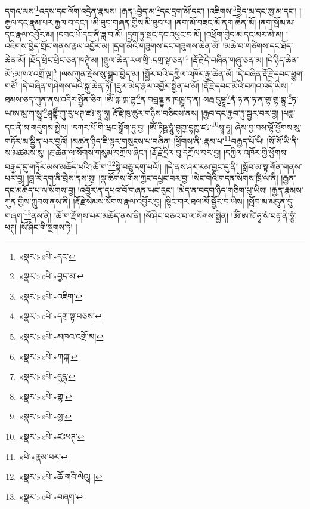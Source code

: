 དགའ་ལས་\footnote{«སྣར་»«པེ་»དང་}འདས་དང་ལོག་འདྲེན་རྣམས། །རྒན་:བྱེད་མ་\footnote{«སྣར་»«པེ་»བྱད་མ་}དང་དྲག་མོ་དང་། །འཇིགས་\footnote{«སྣར་»«པེ་»འཇིག་}བྱེད་མ་དང་ཨུ་མ་དང་། །རྒྱལ་དང་རྣམ་པར་རྒྱལ་བ་དང་། །མི་ཐུབ་གཞན་གྱིས་མི་ཐུབ་པ། །ནག་མོ་བཟང་མོ་ནག་ཆེན་མོ། །ནག་སྦོམ་མ་དང་རྣལ་འབྱོར་མ། །དབང་པོ་དང་ནི་ཟླ་བ་མོ། །དྲག་ཏུ་སྡང་དང་འཕྱང་བ་མོ། །འཕྲོག་བྱེད་མ་དང་མར་མེ་མ། །འཇིགས་བྱེད་གྲོང་གནས་རྣལ་འབྱོར་མ། །དྲག་མོའི་གཟུགས་དང་གཟུགས་ཆེན་མོ། །མཆེ་བ་གཙིགས་དང་ཐོད་ཆེན་མོ། །ཐོད་ཕྲེང་ཕྲེང་ཅན་ཁཊྭཱཾ་མ། །སྦྲུལ་ཆེན་རལ་གྲི་:དགྲ་སྟ་ཅན།\footnote{«སྣར་»«པེ་»དགྲ་སྟ་བཅས།} །རྡོ་རྗེ་དེ་བཞིན་གཞུ་ཅན་མ། །དེ་ཉིད་ཆེན་མོ་:མཁའ་འགྲོ་ལྔ།\footnote{«སྣར་»«པེ་»མཁའ་འགྲོ་མ།} །ལས་ཀུན་རྗེས་སུ་སྒྲུབ་བྱེད་མ། །སྦྱོར་བའི་དཀྱིལ་འཁོར་རྒྱ་ཆེན་མོ། །དེ་བཞིན་རྡོ་རྗེ་དབང་ཕྱུག་གཙོ། །དེ་བཞིན་གཤེགས་པའི་སྐུ་ཆེན་ཏེ། །རྡུལ་མེད་རྣལ་འབྱོར་སྦྱིན་པ་མོ། །རྡོ་རྗེ་དབང་མོའི་བཀའ་འདི་ཡིས། །ཐམས་ཅད་ཀུན་ནས་འདིར་སྤྱོན་ཅིག །ཨོཾ་ཀྐ་ཀྐ་ཌྷ་\footnote{«སྣར་»«པེ་»ཀཀྐ་}ན་བབྦནྡྷ་ན་ཁཁྑཱ་ད་ན། སརྦ་དུཥྚཱ་\footnote{«སྣར་»«པེ་»དུཥྚ་}ནཾ་ཧ་ན་ཧ་ན་གྷ་གྷ་གྷཱ་\footnote{«སྣར་»«པེ་»གྷ་}ཏ་ཡ་ཨ་མུ་ཀ་སྱཱ་\footnote{«སྣར་»«པེ་»སྱ་}ཤཱནྟིཾ་ཀུ་རུ་ཕཊ་ཛཿ་སྭཱ་ཧཱ། རྡོ་རྗེ་ཁུ་ཚུར་གཉིས་བཅིངས་ནས། །རྒྱབ་དང་རྒྱབ་ཏུ་སྦྱར་བར་བྱ། །པདྨ་དང་ནི་ས་གདུགས་སྤྲེལ། །དཀར་པོ་གི་ཝང་སྒྲོག་ཏུ་བྱ། །ཨོཾ་ཏིཥྛ་ཧཱུཾ་བྷཀྵ་བྷཀྵ་ཛཿ་\footnote{«སྣར་»«པེ་»ཛཿཕཊ་}སྭཱ་ཧཱ། ཞེས་བྱ་བས་ལྷོ་ཕྱོགས་སུ་གཏོར་མ་སྦྱིན་པར་བྱའོ། །མཚན་ཉིད་ཇི་ལྟར་གསུངས་པ་བཞིན། །ཕྱོགས་ནི་:རྣམ་པ་\footnote{«པེ་»རྣམ་པར་}བརྒྱད་པོ་ཡི། །སོ་སོ་ཡི་ནི་ས་མཚམས་སུ། །རྔ་ཆེན་ལ་སོགས་གསུམ་བཀྲོལ་ཞིང་། །རྡོ་རྗེ་དྲིལ་བུ་དཀྲོལ་བར་བྱ། །དཀྱིལ་འཁོར་གྱི་ཕྱོགས་བརྒྱད་དུ་གཏོར་མས་མཆོད་པའི་:ཆོ་ག་\footnote{«སྣར་»«པེ་»ཆོ་གའི་ལེའུ། །}སྟེ་བཅུ་དགུ་པའོ།། །།དེ་ནས་ཤར་རམ་བྱང་དུ་ནི། །སློབ་མ་སྟ་གོན་གནས་པར་བྱ། །བླ་རེ་དག་ནི་བྲེས་ནས་སུ། །སྣ་ཚོགས་གོས་ཀྱང་དཔྱང་བར་བྱ། །སེང་གེའི་གདན་སོགས་ཁྲི་ལ་ནི། །རྒྱན་དང་མཆོད་པ་ལ་སོགས་བྱ། །འབྱོར་ན་དཔའ་བོ་གཞན་ཡང་རུང་། །མེད་ན་བདག་ཉིད་གཅིག་པུ་ཡིས། །རྒྱན་རྣམས་ཀུན་གྱིས་ཀླུབས་ནས་ནི། །རྡོ་རྗེ་སེམས་སོགས་རྣལ་འབྱོར་བྱ། །སྙིང་གར་ཐལ་མོ་སྦྱོར་བ་ཡིས། །སློབ་མ་མདུན་དུ་གཞག་\footnote{«སྣར་»«པེ་»བཞག་}ནས་ནི། །ཆོ་ག་རྫོགས་པར་མཆོད་ནས་ནི། །སོ་ཤིང་བཅའ་བ་ལ་སོགས་སྦྱིན། །ཨོཾ་ཨ་ཛི་ཧྭ་སཾ་བརྟ་ནི་ཧཱུཾ་ཕཊ། །སོ་ཤིང་གི་སྔགས་ཏེ། །
